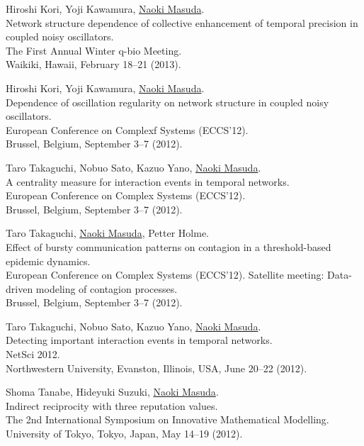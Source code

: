 \documentclass[11pt,letter]{article}
\begin{document}
\begin{etaremune}
\item Hiroshi Kori, Yoji Kawamura, \underline{Naoki Masuda}.\\
Network structure dependence of collective enhancement of temporal precision in coupled noisy oscillators.\\
The First Annual Winter q-bio Meeting.\\
Waikiki, Hawaii, February 18--21 (2013).

\item Hiroshi Kori, Yoji Kawamura, \underline{Naoki Masuda}.\\
Dependence of oscillation regularity on network structure in coupled noisy oscillators.\\
European Conference on Complexf Systems (ECCS'12).\\
Brussel, Belgium, September 3--7 (2012).

\item Taro Takaguchi, Nobuo Sato, Kazuo Yano, \underline{Naoki Masuda}.\\
A centrality measure for interaction events in temporal networks.\\
European Conference on Complex Systems (ECCS'12).\\
Brussel, Belgium, September 3--7 (2012).

\item Taro Takaguchi, \underline{Naoki Masuda}, Petter Holme.\\
Effect of bursty communication patterns on contagion in a threshold-based epidemic dynamics.\\
European Conference on Complex Systems (ECCS'12). Satellite meeting: Data-driven modeling of contagion processes.\\
Brussel, Belgium, September 3--7 (2012).

\item Taro Takaguchi, Nobuo Sato, Kazuo Yano, \underline{Naoki Masuda}.\\
Detecting important interaction events in temporal networks.\\
NetSci 2012.\\
Northwestern University, Evanston, Illinois, USA, June 20--22 (2012).

\item Shoma Tanabe, Hideyuki Suzuki, \underline{Naoki Masuda}.\\
Indirect reciprocity with three reputation values.\\
The 2nd International Symposium on Innovative Mathematical Modelling.\\
University of Tokyo, Tokyo, Japan, May 14--19 (2012).


\end{etaremune}
\end{document}
